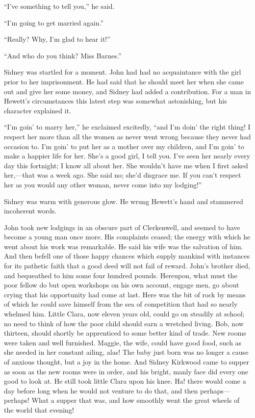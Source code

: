 ``I've something to tell you,'' he said.

``I'm going to get married again.''

``Really? Why, I'm glad to hear it!''

``And who do you think? Miss Barnes.''

Sidney was startled for a moment. John had had no acquaintance with the
girl prior to her imprisonment. He had said that he should meet her when
she came out and give her some money, and Sidney had added a
contribution. For a man in Hewett's circumstances this latest step was
{\protect\hypertarget{132}{}{}}somewhat astonishing, but his character
explained it.

``I'm goin' to marry her,'' he exclaimed excitedly, ``and I'm doin' the
right thing! I respect her more than all the women as never went wrong
because they never had occasion to. I'm goin' to put her as a mother
over my children, and I'm goin' to make a happier life for her. She's a
good girl, I tell you. I've seen her nearly every day this fortnight; I
know all about her. She wouldn't have me when I first asked her,---that
was a week ago. She said no; she'd disgrace me. If you can't respect her
as you would any other woman, never come into my lodging!''

Sidney was warm with generous glow. He wrung Hewett's hand and stammered
incoherent words.

John took new lodgings in an obscure part of Clerkenwell, and seemed to
have become a young man once more. His complaints ceased; the energy
with which he went about his work was remarkable. He said his wife
{\protect\hypertarget{133}{}{}}was the salvation of him. And then befell
one of those happy chances which supply mankind with instances for its
pathetic faith that a good deed will not fail of reward. John's brother
died, and bequeathed to him some four hundred pounds. Hereupon, what
must the poor fellow do but open workshops on his own account, engage
men, go about crying that his opportunity had come at last. Here was the
bit of rock by means of which he could save himself from the sea of
competition that had so nearly whelmed him. Little Clara, now eleven
years old, could go on steadily at school; no need to think of how the
poor child should earn a wretched living. Bob, now thirteen, should
shortly be apprenticed to some better kind of trade. New rooms were
taken and well furnished. Maggie, the wife, could have good food, such
as she needed in her constant ailing, alas! The baby just born was no
longer a cause of anxious thought, but a joy in the home. And Sidney
Kirkwood came to supper as soon as the new rooms were in order, and his
bright, {\protect\hypertarget{134}{}{}}manly face did every one good to
look at. He still took little Clara upon his knee. Ha! there would come
a day before long when he would not venture to do that, and then
perhaps---perhaps! What a supper that was, and how smoothly went the
great wheels of the world that evening!


